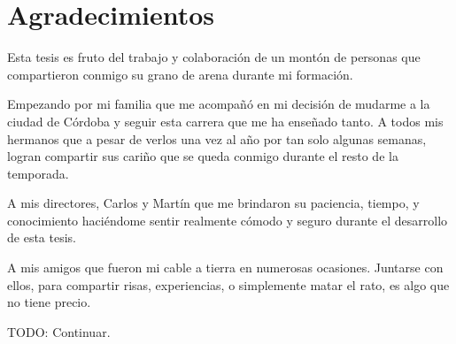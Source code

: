 \chapter*{\center \Large  Agradecimientos}
Esta tesis es fruto del trabajo y colaboración de un montón de personas que compartieron conmigo su grano de arena durante mi formación.

Empezando por mi familia que me acompañó en mi decisión de mudarme a la ciudad de Córdoba y seguir esta carrera que me ha enseñado tanto. A todos
mis hermanos que a pesar de verlos una vez al año por tan solo algunas semanas, 
logran compartir sus cariño que se queda conmigo durante el resto de la temporada.

A mis directores, Carlos y Martín que me brindaron su paciencia, tiempo, y conocimiento haciéndome sentir realmente cómodo y seguro durante el desarrollo de esta tesis. 

A mis amigos que fueron mi cable a tierra en numerosas ocasiones. Juntarse con ellos, para compartir risas, experiencias, o simplemente matar el rato, es algo que no tiene precio.

TODO: Continuar.